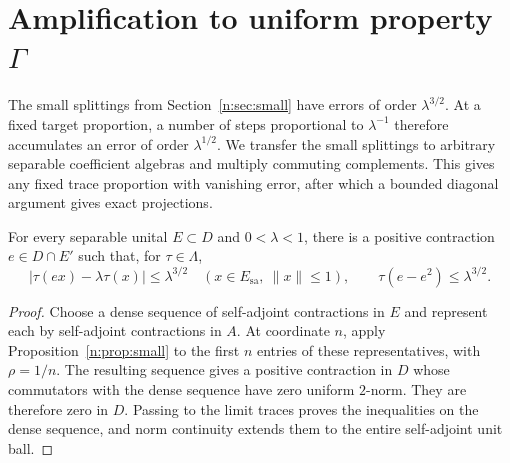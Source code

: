 \section{Amplification to uniform property \texorpdfstring{$\Gamma$}{Gamma}}\label{n:sec:amplification}

The small splittings from Section~\ref{n:sec:small} have errors of order
$\lambda^{3/2}$. At a fixed target proportion, a number of steps
proportional to $\lambda^{-1}$ therefore accumulates an error of order
$\lambda^{1/2}$. We transfer the small splittings to arbitrary separable
coefficient algebras and multiply commuting complements. This gives any
fixed trace proportion with vanishing error, after which a bounded
diagonal argument gives exact projections.

\begin{lemma}\label{n:lem:relative-small}
For every separable unital $E\subset D$ and $0<\lambda<1$, there is a
positive contraction $e\in D\cap E'$ such that, for $\tau\in \Lambda$,
\begin{equation}\label{n:eq:relative-small}
 |\tau(ex)-\lambda\tau(x)|\le\lambda^{3/2}
 \quad(x\in E_{\mathrm{sa}},\ \|x\|\le1),
 \qquad \tau(e-e^2)\le\lambda^{3/2}.
\end{equation}
\end{lemma}
\begin{proof}
Choose a dense sequence of self-adjoint contractions in $E$ and represent
each by self-adjoint contractions in $A$. At coordinate $n$, apply
Proposition~\ref{n:prop:small} to the first $n$ entries of these
representatives, with $\rho=1/n$. The resulting sequence gives a positive
contraction in $D$ whose commutators with the dense sequence have zero
uniform $2$-norm. They are therefore zero in $D$. Passing to the limit
traces proves the inequalities on the dense sequence, and norm continuity
extends them to the entire self-adjoint unit ball.
\end{proof}

